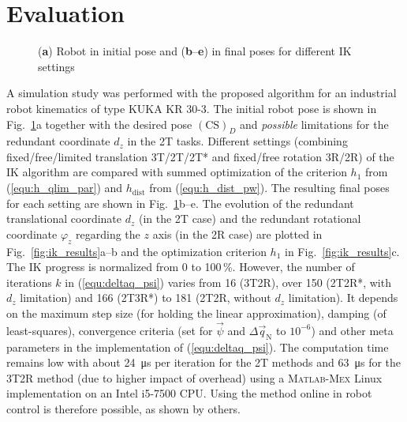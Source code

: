 \documentclass[graybox,vecphys]{svmult}
\newcommand{\ks}[1]{{(\mathrm{CS})_{#1}}}
\newcommand{\ResR}[0]{\vec{\psi}}
\begin{document}
\vspace{-0.3cm}
\section{Evaluation}
\vspace{-0.2cm}
\label{sec:simulation}


\begin{figure}[b]
\vspace{-0.3cm}
\centering

\vspace{-0.1cm}
\caption{(\textbf{a}) Robot in initial pose and (\textbf{b}--\textbf{e}) in final poses for different IK settings}
\label{fig:robots_ik_results}
\end{figure}

A simulation study was performed with the proposed algorithm for an industrial robot kinematics of type KUKA KR 30-3.
The initial robot pose is shown in Fig.~\ref{fig:robots_ik_results}a together with the desired pose $\ks{D}$ and \emph{possible} limitations for the redundant coordinate $d_z$ in the 2T tasks. 
Different settings (combining fixed/free/limited translation 3T/2T/2T* and fixed/free rotation 3R/2R) of the IK algorithm are compared with summed optimization of the criterion $h_1$ from (\ref{equ:h_qlim_par}) and $h_\mathrm{dist}$ from (\ref{equ:h_dist_pw}).
The resulting final poses for each setting are shown in Fig.~\ref{fig:robots_ik_results}b--e.
The evolution of the redundant translational coordinate $d_z$ (in the 2T case) and the redundant rotational coordinate $\varphi_z$ regarding the $z$ axis (in the 2R case) are plotted in Fig.~\ref{fig:ik_results}a--b and the optimization criterion $h_1$ in
Fig.~\ref{fig:ik_results}c.
The IK progress is normalized from 0 to 100\,\%.
However, the number of iterations $k$ in (\ref{equ:deltaq_psi}) varies from 16 (3T2R), over 150 (2T2R*, with $d_z$ limitation) and 166 (2T3R*) to 181 (2T2R, without $d_z$ limitation).
It depends on the maximum step size (for holding the linear approximation), damping (of least-squares), convergence criteria (set for $\ResR$ and ${\Delta}\vec{q}_{\mathrm{N}}$ to $10^{-6}$) and other meta parameters in the implementation of (\ref{equ:deltaq_psi}).
%
The computation time remains low with about \SI{24}{\micro\second} per iteration for the 2T methods and \SI{63}{\micro\second} for the 3T2R method (due to higher impact of overhead) using a \textsc{Matlab-Mex} Linux implementation on an Intel i5-7500 CPU.
Using the method online in robot control is therefore possible, as shown by others.
\end{document}
